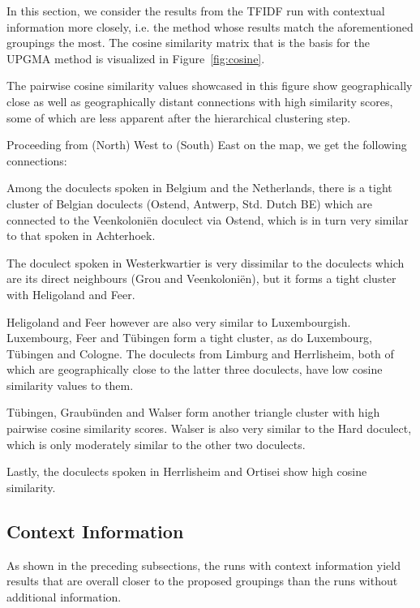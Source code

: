 \documentclass[a4paper]{article}
\begin{document}
In this section, we consider the results from
the TFIDF run with contextual information more closely,
i.e. the method whose results match the aforementioned
groupings the most.
The cosine similarity matrix that is the basis for the UPGMA method
is visualized in Figure~\ref{fig:cosine}.


The pairwise cosine similarity values showcased in this figure
show geographically close as well as geographically distant connections
with high similarity scores,
some of which are less apparent after the hierarchical clustering step.

Proceeding from (North) West to (South) East on the map,
we get the following connections:

Among the doculects spoken in Belgium and the Netherlands,
there is a tight cluster of Belgian doculects (Ostend, Antwerp, Std. Dutch BE)
which are connected to the Veenkoloni\"{e}n doculect via Ostend,
which is in turn very similar to that spoken in Achterhoek.

The doculect spoken in Westerkwartier is very dissimilar to
the doculects which are its direct neighbours (Grou and Veenkoloni\"{e}n),
but it forms a tight cluster with Heligoland and Feer.

Heligoland and Feer however are also very similar to Luxembourgish.
Luxembourg, Feer and T\"{u}bingen form a tight cluster,
as do Luxembourg, T\"{u}bingen and Cologne.
The doculects from Limburg and Herrlisheim,
both of which are geographically close to the latter three doculects,
have low cosine similarity values to them.

T\"{u}bingen, Graub\"{u}nden and Walser form another
triangle cluster with high pairwise cosine similarity scores.
Walser is also very similar to the Hard doculect,
which is only moderately similar to the other two doculects.

Lastly, the doculects spoken in Herrlisheim and Ortisei
show high cosine similarity.

\subsection{Context Information}

As shown in the preceding subsections,
the runs with context information yield results
that are overall closer to the proposed groupings
than the runs without additional information.
\end{document}
